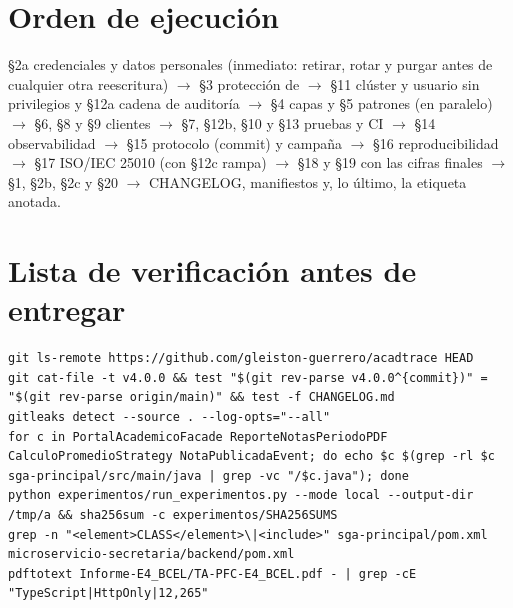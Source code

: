 \section{Orden de ejecuci\'on}
\S2a credenciales y datos personales (inmediato: retirar, rotar y purgar antes de cualquier otra reescritura) $\rightarrow$ \S3 protecci\'on de  $\rightarrow$ \S11 cl\'uster y usuario sin privilegios y \S12a cadena de auditor\'ia $\rightarrow$ \S4 capas y \S5 patrones (en paralelo) $\rightarrow$ \S6, \S8 y \S9 clientes $\rightarrow$ \S7, \S12b, \S10 y \S13 pruebas y CI $\rightarrow$ \S14 observabilidad $\rightarrow$ \S15 protocolo (commit) y campa\~na $\rightarrow$ \S16 reproducibilidad $\rightarrow$ \S17 ISO/IEC 25010 (con \S12c rampa) $\rightarrow$ \S18 y \S19 con las cifras finales $\rightarrow$ \S1, \S2b, \S2c y \S20 $\rightarrow$ CHANGELOG, manifiestos y, lo \'ultimo, la etiqueta anotada.

\section{Lista de verificaci\'on antes de entregar}
\begin{verbatim}
git ls-remote https://github.com/gleiston-guerrero/acadtrace HEAD
git cat-file -t v4.0.0 && test "$(git rev-parse v4.0.0^{commit})" = "$(git rev-parse origin/main)" && test -f CHANGELOG.md
gitleaks detect --source . --log-opts="--all"
for c in PortalAcademicoFacade ReporteNotasPeriodoPDF CalculoPromedioStrategy NotaPublicadaEvent; do echo $c $(grep -rl $c sga-principal/src/main/java | grep -vc "/$c.java"); done
python experimentos/run_experimentos.py --mode local --output-dir /tmp/a && sha256sum -c experimentos/SHA256SUMS
grep -n "<element>CLASS</element>\|<include>" sga-principal/pom.xml microservicio-secretaria/backend/pom.xml
pdftotext Informe-E4_BCEL/TA-PFC-E4_BCEL.pdf - | grep -cE "TypeScript|HttpOnly|12,265"
\end{verbatim}

\piedepagina

